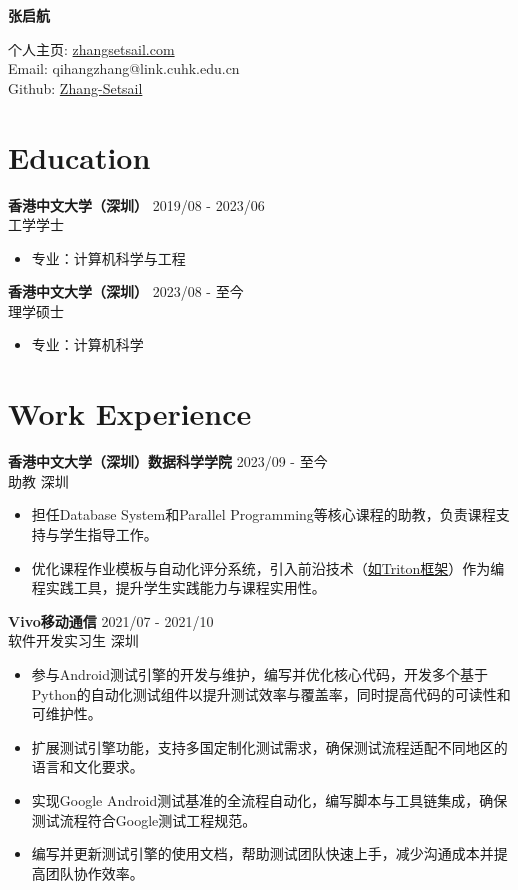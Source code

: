 \documentclass[a4paper]{article}
\begin{document}
\centerline{\Large\bf 张启航}
\centerline{个人主页: \href{https://zhangsetsail.com/zn_ch}{zhangsetsail.com} \\ Email: qihangzhang@link.cuhk.edu.cn \\ Github: \href{https://github.com/Zhang-Setsail}{Zhang-Setsail}} 

\section*{Education}
\textbf{香港中文大学（深圳）} \hfill 2019/08 - 2023/06 \\
工学学士
\begin{itemize}[noitemsep]
  \item 专业：计算机科学与工程
\end{itemize}

\textbf{香港中文大学（深圳）} \hfill 2023/08 - 至今 \\
理学硕士
\begin{itemize}[noitemsep]
  \item 专业：计算机科学
\end{itemize}

\section*{Work Experience}
\textbf{香港中文大学（深圳）数据科学学院} \hfill 2023/09 - 至今 \\
 助教 \hfill 深圳
\begin{itemize}[noitemsep]
\item 担任Database System和Parallel Programming等核心课程的助教，负责课程支持与学生指导工作。
\item 优化课程作业模板与自动化评分系统，引入前沿技术（\href{https://github.com/tonyyxliu/CUHKSZ-CSC4005/tree/main/project4}{如Triton框架}）作为编程实践工具，提升学生实践能力与课程实用性。
\end{itemize}

\textbf{Vivo移动通信} \hfill 2021/07 - 2021/10 \\
 软件开发实习生 \hfill 深圳
\begin{itemize}[noitemsep]
\item 参与Android测试引擎的开发与维护，编写并优化核心代码，开发多个基于Python的自动化测试组件以提升测试效率与覆盖率，同时提高代码的可读性和可维护性。
\item 扩展测试引擎功能，支持多国定制化测试需求，确保测试流程适配不同地区的语言和文化要求。
\item 实现Google Android测试基准的全流程自动化，编写脚本与工具链集成，确保测试流程符合Google测试工程规范。
\item 编写并更新测试引擎的使用文档，帮助测试团队快速上手，减少沟通成本并提高团队协作效率。
\end{itemize}
\end{document}
